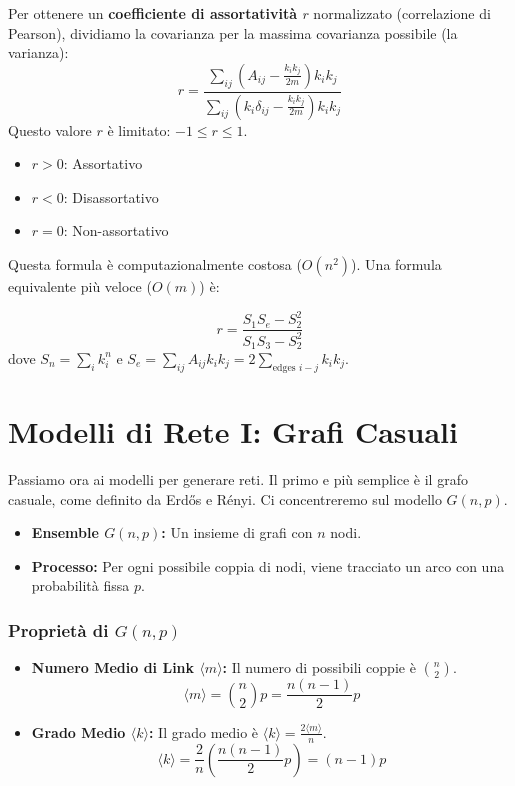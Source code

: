 Per ottenere un \textbf{coefficiente di assortatività $r$} normalizzato (correlazione di Pearson), dividiamo la covarianza per la massima covarianza possibile (la varianza):
\begin{equation}
r = \frac{\sum_{ij} (A_{ij} - \frac{k_i k_j}{2m}) k_i k_j}{\sum_{ij} (k_i \delta_{ij} - \frac{k_i k_j}{2m}) k_i k_j}
\end{equation}
Questo valore $r$ è limitato: $-1 \le r \le 1$.
\begin{itemize}
\item $r > 0$: Assortativo
\item $r < 0$: Disassortativo
\item $r = 0$: Non-assortativo
\end{itemize}
Questa formula è computazionalmente costosa ($O(n^2)$). Una formula equivalente più veloce ($O(m)$) è:
\begin{tcolorbox} [colback=yellow!25, colframe=yellow!75!orange, coltitle=black, title=\textbf{Coefficiente di Assortatività}]
\begin{equation}
r = \frac{S_1 S_e - S_2^2}{S_1 S_3 - S_2^2}
\end{equation}
dove $S_n = \sum_i k_i^n$ e $S_e = \sum_{ij} A_{ij} k_i k_j = 2 \sum_{\text{edges } i-j} k_i k_j$.
\end{tcolorbox}

\section{Modelli di Rete I: Grafi Casuali}
Passiamo ora ai modelli per generare reti. Il primo e più semplice è il grafo casuale, come definito da Erdős e Rényi. Ci concentreremo sul modello $G(n,p)$.

\begin{itemize}
\item \textbf{Ensemble $G(n,p)$:} Un insieme di grafi con $n$ nodi.
\item \textbf{Processo:} Per ogni possibile coppia di nodi, viene tracciato un arco con una probabilità fissa $p$.
\end{itemize}

\subsubsection{Proprietà di $G(n,p)$}
\begin{itemize}
\item \textbf{Numero Medio di Link $\langle m \rangle$:} Il numero di possibili coppie è $\binom{n}{2}$.
\begin{equation}
 \langle m \rangle = \binom{n}{2} p = \frac{n(n-1)}{2} p
 \end{equation}

\item \textbf{Grado Medio $\langle k \rangle$:} Il grado medio è $\langle k \rangle = \frac{2\langle m \rangle}{n}$.
\begin{equation}
 \langle k \rangle = \frac{2}{n} \left( \frac{n(n-1)}{2} p \right) = (n-1)p
 \end{equation}
\end{itemize}

